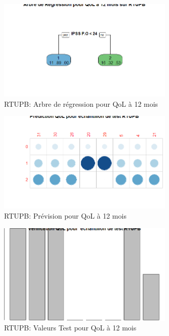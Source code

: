 \begin{figure}[H]
\centering
\includegraphics[width=0.75\textwidth]{../Fig/RTUPB/rtupb-regtree-qol12.png}
\caption{RTUPB: Arbre de régression pour QoL à 12 mois}
\label{fig-rtupb-regtree-qol12}
\end{figure}

\begin{figure}[H]
\centering
\includegraphics[width=0.75\textwidth]{../Fig/RTUPB/rtupb-regtree-predict-qol12.png}
\caption{RTUPB: Prévision pour QoL à 12 mois}
\label{fig-rtupb-regtree-predict-qol12}
\end{figure}

\begin{figure}[H]
\centering
\includegraphics[width=0.75\textwidth]{../Fig/RTUPB/rtupb-regtree-test-qol12.png}
\caption{RTUPB: Valeurs Test pour QoL à 12 mois}
\label{fig-rtupb-regtree-test-qol12}
\end{figure}

